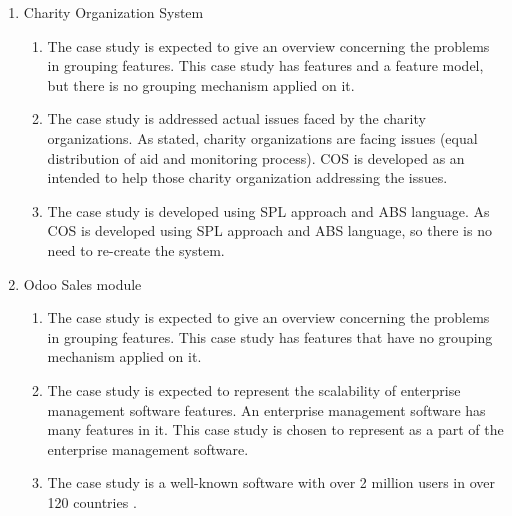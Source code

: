 \begin{enumerate}
	\item Charity Organization System 
	\begin{enumerate}
		\item The case study is expected to give an overview concerning the problems in grouping features. This case study has features and  a feature model, but there is no grouping mechanism applied on it.
		\item The case study is addressed actual issues faced by the charity organizations. As stated, charity organizations are facing issues (equal distribution of aid and monitoring process). COS is developed as an intended to help those charity organization addressing the issues.
		\item The case study is developed using SPL approach and ABS language. As COS is developed using SPL approach and ABS language, so there is no need to re-create the system.
	\end{enumerate}
	\item Odoo Sales module
	\begin{enumerate}
		\item The case study is expected to give an overview concerning the problems in grouping features. This case study has features that have no grouping mechanism applied on it.
		\item The case study is expected to represent the scalability of enterprise management software features. An enterprise management software has many features in it. This case study is chosen to represent as a part of the enterprise management software.
		\item The case study is a well-known software with over 2 million users in over 120 countries \citep{web.Odoo.ERPComparison}.
	\end{enumerate}
\end{enumerate}